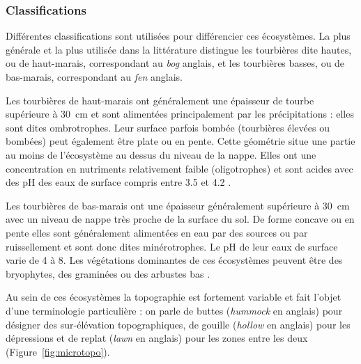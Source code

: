 \subsubsection{Classifications}

Différentes classifications sont utilisées pour différencier ces écosystèmes.
La plus générale et la plus utilisée dans la littérature distingue les tourbières dite hautes, ou de haut-marais, correspondant au \textit{bog} anglais, et les tourbières basses, ou de bas-marais, correspondant au \textit{fen} anglais.

Les tourbières de haut-marais ont généralement une épaisseur de tourbe supérieure à \SI{30}{\cm} et sont alimentées principalement par les précipitations : elles sont dites ombrotrophes.
Leur surface parfois bombée (tourbières élevées ou bombées) peut également être plate ou en pente.
Cette géométrie situe une partie au moins de l'écosystème au dessus du niveau de la nappe.
Elles ont une concentration en nutriments relativement faible (oligotrophes) et sont acides avec des pH des eaux de surface compris entre 3.5 et 4.2 \citep{rydin2013a}.

Les tourbières de bas-marais ont une épaisseur généralement supérieure à \SI{30}{\cm} avec un niveau de nappe très proche de la surface du sol.
De forme concave ou en pente elles sont généralement alimentées en eau par des sources ou par ruissellement et sont donc dites minérotrophes.
Le pH de leur eaux de surface varie de 4 à 8.
Les végétations dominantes de ces écosystèmes peuvent être des bryophytes, des graminées ou des arbustes bas \citep{rydin2013a}.

Au sein de ces écosystèmes la topographie est fortement variable et fait l'objet d'une terminologie particulière : on parle de buttes (\textit{hummock} en anglais) pour désigner des sur-élévation topographiques, de gouille (\textit{hollow} en anglais) pour les dépressions et de replat (\textit{lawn} en anglais) pour les zones entre les deux (Figure~\ref{fig:microtopo}).


